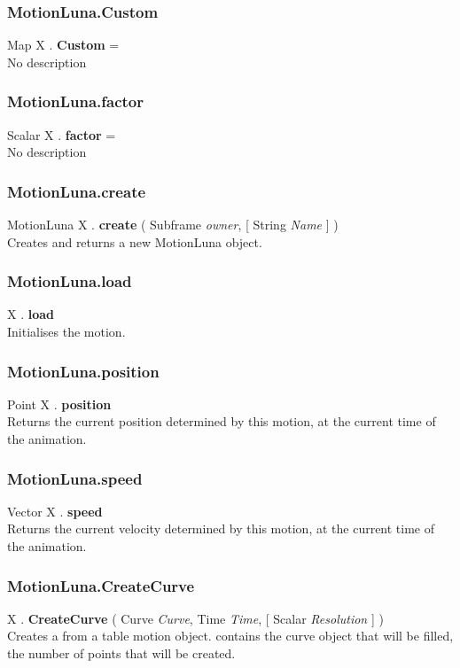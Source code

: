 \subsubsection{MotionLuna.Custom \label{F:MotionLuna:Custom}}
Map X . \textbf{Custom} = \\
No description

\subsubsection{MotionLuna.factor \label{F:MotionLuna:factor}}
Scalar X . \textbf{factor} = \\
No description

\subsubsection{MotionLuna.create \label{F:MotionLuna:create}}
MotionLuna X . \textbf{create} ( Subframe \textit{owner},  [ String \textit{Name} ] ) \\
Creates and returns a new MotionLuna object.

\subsubsection{MotionLuna.load \label{F:MotionLuna:load}}
X . \textbf{load} \\
Initialises the motion.

\subsubsection{MotionLuna.position \label{F:MotionLuna:position}}
Point X . \textbf{position} \\
Returns the current position determined by this motion, at the current time of the animation.


\subsubsection{MotionLuna.speed \label{F:MotionLuna:speed}}
Vector X . \textbf{speed} \\
Returns the current velocity determined by this motion, at the current time of the animation.


\subsubsection{MotionLuna.CreateCurve \label{F:MotionLuna:CreateCurve}}
X . \textbf{CreateCurve} ( Curve \textit{Curve}, Time \textit{Time},  [ Scalar \textit{Resolution} ] ) \\
Creates a  from a table motion object.  contains the curve object that will be filled,  the number of points that will be created.



